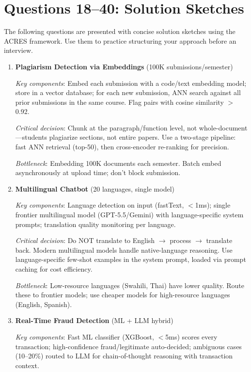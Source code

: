 \section{Questions 18--40: Solution Sketches}

The following questions are presented with concise solution sketches using the ACRES framework. Use them to practice structuring your approach before an interview.

\begin{enumerate}[leftmargin=*]
    \item[Q18.] \textbf{Plagiarism Detection via Embeddings} (100K submissions/semester)

    \textit{Key components}: Embed each submission with a code/text embedding model; store in a vector database; for each new submission, ANN search against all prior submissions in the same course. Flag pairs with cosine similarity $>$ 0.92.

    \textit{Critical decision}: Chunk at the paragraph/function level, not whole-document---students plagiarize sections, not entire papers. Use a two-stage pipeline: fast ANN retrieval (top-50), then cross-encoder re-ranking for precision.

    \textit{Bottleneck}: Embedding 100K documents each semester. Batch embed asynchronously at upload time; don't block submission.

    \item[Q19.] \textbf{Multilingual Chatbot} (20 languages, single model)

    \textit{Key components}: Language detection on input (fastText, $<$1ms); single frontier multilingual model (GPT-5.5/Gemini) with language-specific system prompts; translation quality monitoring per language.

    \textit{Critical decision}: Do NOT translate to English $\to$ process $\to$ translate back. Modern multilingual models handle native-language reasoning. Use language-specific few-shot examples in the system prompt, loaded via prompt caching for cost efficiency.

    \textit{Bottleneck}: Low-resource languages (Swahili, Thai) have lower quality. Route these to frontier models; use cheaper models for high-resource languages (English, Spanish).

    \item[Q20.] \textbf{Real-Time Fraud Detection} (ML + LLM hybrid)

    \textit{Key components}: Fast ML classifier (XGBoost, $<$5ms) scores every transaction; high-confidence fraud/legitimate auto-decided; ambiguous cases (10--20\%) routed to LLM for chain-of-thought reasoning with transaction context.


\end{enumerate}
